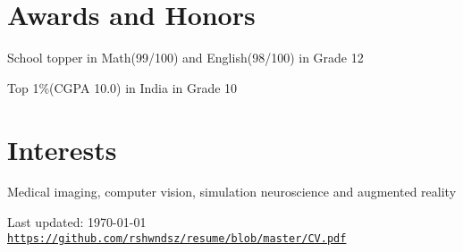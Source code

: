 \documentclass[letterpaper]{article}
\def\footerlink{https://github.com/rshwndsz/resume/blob/master/CV.pdf}
\renewenvironment{itemize}{
  \begin{list}{}{
    \setlength{\leftmargin}{1.5em}
  }
}{
  \end{list}
}
\begin{document}
\section*{Awards and Honors}
\begin{itemize}
  \item School topper in Math(99/100) and English(98/100) in Grade 12
  \item Top 1\%(CGPA 10.0) in India in Grade 10
\end{itemize}


\section*{Interests}
  \begin{itemize}
    \item Medical imaging, computer vision, simulation neuroscience and augmented reality
  \end{itemize}


\bigskip
\begin{center}
  \begin{footnotesize}
    Last updated: \today \\
    \href{\footerlink}{\texttt{\footerlink}}
  \end{footnotesize}
\end{center}
\end{document}
